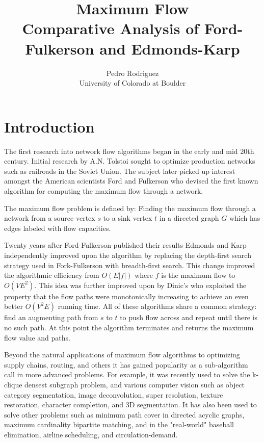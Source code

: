 \documentclass{article}
\begin{document}
\title{Maximum Flow\\Comparative Analysis of Ford-Fulkerson and Edmonds-Karp}

\author{Pedro Rodriguez\\
University of Colorado at Boulder
}

\maketitle
\section{Introduction}
The first research into network flow algorithms began in the early and mid 20th century. Initial research by A.N. Tolstoi sought to optimize production networks such as railroads in the Soviet Union\cite{Schrijver:2002dj}. The subject later picked up interest amongst the American scientists Ford and Fulkerson who devised the first known algorithm for computing the maximum flow through a network\cite{Ford:1956vc}. 

The maximum flow problem is defined by: Finding the maximum flow through a network from a source vertex $s$ to a sink vertex $t$ in a directed graph $G$ which has edges labeled with flow capacities.

Twenty years after Ford-Fulkerson published their results Edmonds and Karp independently improved upon the algorithm by replacing the depth-first search strategy used in Fork-Fulkerson with breadth-first search\cite{Edmonds:1972ht}. This change improved the algorithmic efficiency from $O(E|f|)$ where $f$ is the maximum flow to $O(VE^2)$. This idea was further improved upon by Dinic's who exploited the property that the flow paths were monotonically increasing to achieve an even better $O(V^2E)$ running time\cite{Dinic:lsM40ti7}. All of these algorithms share a common strategy: find an augmenting path from $s$ to $t$ to push flow across and repeat until there is no such path. At this point the algorithm terminates and returns the maximum flow value and paths.

Beyond the natural applications of maximum flow algorithms to optimizing supply chains, routing, and others it has gained popularity as a sub-algorithm call in more advanced problems. For example, it was recently used to solve the k-clique densest subgraph problem\cite{tsourakakis2015k}, and various computer vision such as object category segmentation, image deconvolution, super resolution, texture restoration, character completion, and 3D segmentation\cite{Verma:2012gs}. It has also been used to solve other problems such as minimum path cover in directed acyclic graphs, maximum cardinality bipartite matching, and in the "real-world" baseball elimination, airline scheduling, and circulation-demand\cite{wiki:maxflow}.
\end{document}
